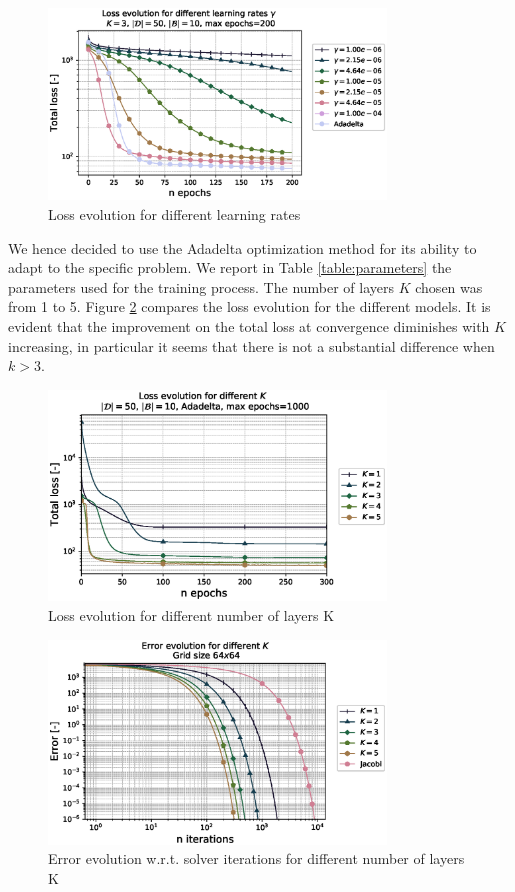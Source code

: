 \begin{figure}[h]
\centering
\includegraphics[width=0.8\textwidth]{figs/hyper.eps}
\caption{Loss evolution for different learning rates}
\label{fig:hyperparam_learning_rate}
\end{figure}    

We hence decided to use the Adadelta optimization method for its ability to adapt to the specific problem. 
We report in Table \ref{table:parameters} the parameters used for the training process. The number of layers $K$ chosen was from 1 to 5. Figure \ref{fig:hyperparam_K} compares the loss evolution for the different models. It is evident that the improvement on the total loss at convergence diminishes with $K$ increasing, in particular it seems that there is not a substantial difference when $k>3$. 

\begin{figure}[h]
\centering
\includegraphics[width=0.8\textwidth]{figs/comparison_K.eps}
\caption{Loss evolution for different number of layers K}
\label{fig:hyperparam_K}
\end{figure}

\begin{figure}[h]
\centering
\includegraphics[width=0.8\textwidth]{figs/error_k.eps}
\caption{Error evolution w.r.t. solver iterations for different number of layers K}
\label{fig:error_K}
\end{figure}

